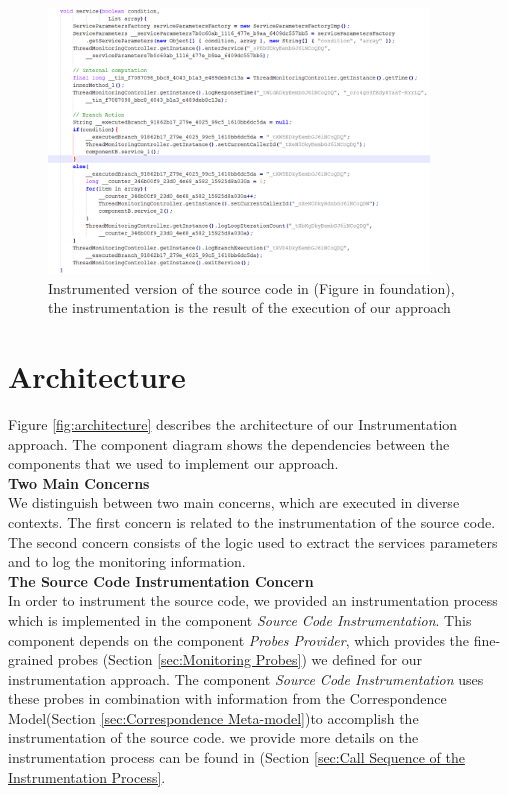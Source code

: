 \begin{figure}[h]
\centering
\includegraphics[width=0.9\textwidth]{figures/instrumented_code}
\caption{Instrumented version of the source code in (Figure in foundation), the instrumentation is the result of the execution of our approach}
\label{fig:instrumented_code}
\end{figure}

\section{Architecture}
\label{sec:architecture}
Figure \ref{fig:architecture} describes the architecture of our Instrumentation approach. The component diagram shows the dependencies between the components that we used to implement our approach. \\

\textbf{Two Main Concerns}\\
We distinguish between two main concerns, which are executed in diverse contexts. The first concern is related to the instrumentation of the source code. The second concern consists of the logic used to extract the services parameters and to log the monitoring information.  \\

\textbf{The Source Code Instrumentation Concern}\\
In order to instrument the source code, we provided an instrumentation process which is implemented in the component \textit{Source Code Instrumentation}. This component depends on the component \textit{Probes Provider}, which provides the fine-grained probes (Section \ref{sec:Monitoring Probes}) we defined for our instrumentation approach. The component \textit{Source Code Instrumentation} uses these probes in combination with information from the Correspondence Model(Section \ref{sec:Correspondence Meta-model})to accomplish the instrumentation of the source code. we provide more details on the instrumentation process can be found in (Section \ref{sec:Call Sequence of the Instrumentation Process}.\\


